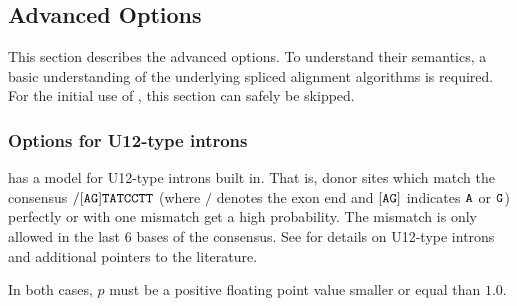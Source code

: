 \documentclass[11pt,a4paper,titlepage]{article}
\begin{document}
\subsection{Advanced Options}
\label{advancedoptions}
This section describes the advanced options.
To understand their semantics,
a basic understanding of the underlying spliced alignment algorithms is required. For the initial use of \Gth, this section can safely be skipped.

\subsubsection{Options for U12-type introns}
\Gth has a model for U12-type introns built in. That is, donor sites which match
the consensus $/[\texttt{A}\texttt{G}]\texttt{T}\texttt{A}\texttt{T}\texttt{C}\texttt{C}\texttt{T}\texttt{T}$ (where $/$ denotes the exon end and $[\texttt{A}\texttt{G}]$ indicates $\texttt{A}$ or $\texttt{G}$) \cite{ZHU:BRE:2003B} perfectly or with one mismatch get a high
probability. The mismatch is only allowed in the last 6 bases of the consensus.
See \cite{ZHU:BRE:2003B} for details on U12-type introns and additional pointers to the literature.

\begin{Justshowoptions}
\end{Justshowoptions}
In both cases, $p$ must be a positive floating point value 
smaller or equal than $1.0$.
\end{document}
